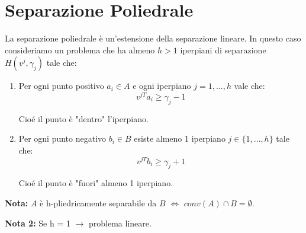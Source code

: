 \section{Separazione Poliedrale}
La separazione poliedrale è un'estensione della separazione lineare. In questo caso
consideriamo un problema che ha almeno $h > 1$ iperpiani di separazione $H(v^j, \gamma_j)$ tale che:
\begin{enumerate}
    \item Per ogni punto positivo $a_i \in A$ e ogni iperpiano $j = 1, \dots, h$ vale che:
    $$
        v^{jT} a_i \geq \gamma_j - 1
    $$

    Cioé il punto è "dentro" l'iperpiano.

    \item Per ogni punto negativo $b_i \in B$ esiste almeno 1 iperpiano $j \in \{1, \dots, h\}$ tale che:
    $$
        v^{jT} b_i \geq \gamma_j + 1
    $$

    Cioé il punto è "fuori" almeno 1 iperpiano.
\end{enumerate}

\textbf{Nota:} $A$ è h-pliedricamente separabile da $B$ $\iff$ $conv(A) \cap B = \emptyset$.

\textbf{Nota 2:} Se h = 1 $\rightarrow$ problema lineare.

